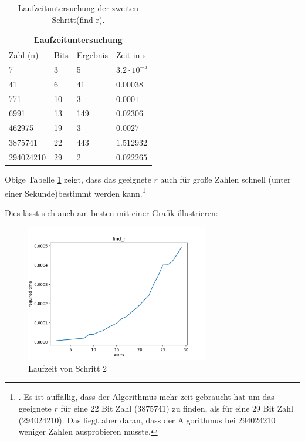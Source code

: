 \documentclass[12pt,oneside]{article}
\theoremstyle{remark}
\theoremstyle{definition}
\begin{document}
\begin{table}[h!]
\centering
\begin{tabular}{ |p{3cm}||p{3cm}|p{3cm}|p{3cm}|  }
 \hline
 \multicolumn{4}{|c|}{Laufzeituntersuchung} \\
 \hline
 Zahl (n)& Bits &Ergebnis&Zeit in s\\
 \hline
 7   & 3    &5&   $3.2 \cdot 10^{-5}$\\
 41&   6  & 41   &$0.00038$\\
 771 &10 & 3&  $0.0001$\\
 6991    &13 & 149&  $0.02306$\\
 462975&   19  & 3&$ 0.0027$\\
 3875741& 22  & 443   &$1.512932$\\
 294024210& 29  & 2&$0.022265$\\
 \hline
\end{tabular}
 \caption{Laufzeituntersuchung der zweiten Schritt(find r).}
\label{table:2}
\end{table}

Obige Tabelle \ref{table:2} zeigt, dass das geeignete $r$ auch für große Zahlen schnell (unter einer Sekunde)bestimmt werden kann.\footnote{. Es ist auffällig, dass der Algorithmus mehr zeit gebraucht hat um das geeignete $r$ für eine 22 Bit Zahl (3875741) zu finden, als für eine 29 Bit Zahl (294024210). Das liegt aber daran, dass der Algorithmus bei 294024210 weniger Zahlen ausprobieren musste.}

Dies lässt sich auch am besten mit einer Grafik illustrieren:
\begin{figure}[h]
\includegraphics[width=8cm]{plots/findR.png}
\centering
\caption{Laufzeit von Schritt 2}
\end{figure}
\end{document}
